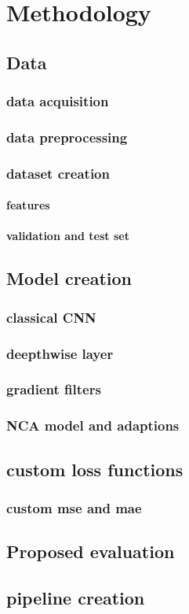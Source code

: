 
\chapter{Methodology} %
\label{Chapter3} %

\section{Data}
\subsection{data acquisition}
\subsection{data preprocessing}
\subsection{dataset creation}
\subsubsection{features}
\subsubsection{validation and test set}

\section{Model creation}
\subsection{classical CNN}
\subsection{deepthwise layer}
\subsection{gradient filters}
\subsection{NCA model and adaptions}

\section{custom loss functions}
\subsection{custom mse and mae}

\section{Proposed evaluation}
\section{pipeline creation}
